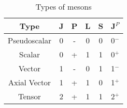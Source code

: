 \begin{table}
\begin{minipage}{\textwidth}
\begin{center}
\begin{singlespacing}

\caption[Types of mesons]{\label{tab:meson_type}Types of mesons}

\begin{tabular}{c c c c c c} %
\hline%
Type & J & P & L & S & J$^{P}$ \\ [0.5ex] %
\hline %
Pseudoscalar & 0 & - & 0 & 0 & 0$^-$\\
Scalar & 0 & + & 1 & 1 & 0$^+$\\
Vector & 1 & - & 0 & 1 & 1$^-$\\
Axial Vector & 1 & + & 1 & 0 & 1$^+$\\
Tensor & 2 & + & 1 & 1 & 2$^+$ \\ [1ex]
\hline \hline%
\end{tabular}

\end{singlespacing}
\end{center}
\end{minipage}
\end{table}
\vspace{20pt}


%
%
